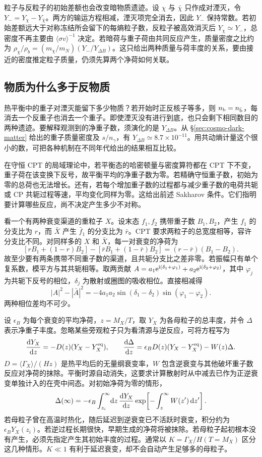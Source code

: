 粒子与反粒子的初始差额也会改变暗物质遗迹。设 $\chi$ 与 $\bar\chi$ 只作成对湮灭，令 $Y_-=Y_\chi-Y_{\bar\chi}$。两方的输运方程相减，湮灭项完全消去，因此 $Y_-$ 保持常数。若初始差额远大于对称冻结所会留下的每熵粒子数，反粒子被高效消灭后 $Y_\chi\simeq Y_-$，总密度不再主要由 $\langle\sigma v\rangle^{-1}$ 决定。若暗荷与重子荷由共同反应产生，质量密度之比约为 $\rho_\chi/\rho_b=(m_\chi/m_N)(Y_-/Y_{\Delta B})$。这只给出两种质量与荷丰度的关系，要由接近的密度推定粒子质量，仍须先算两个净荷如何关联。

\subsection{物质为什么多于反物质}

热平衡中的重子对湮灭能留下多少物质？若开始时正反核子等多，则 $n_{\rm b}=n_{\bar{\rm b}}$，每消去一个反重子也消去一个重子。即使湮灭没有进行到底，也只会剩下相同数目的两种遗迹。要解释观测到的净重子数，须演化的是 $Y_{\Delta B}$。从 \S\ref{sec:cosmo-dark-matter} 给出的重子质量密度及 $s/n_\gamma$，有 $Y_{\Delta B}\simeq8.7\times10^{-11}$。用共动熵计量这个很小的数，可把各种机制在不同年代给出的结果相互比较。

在守恒 CPT 的局域理论中，若平衡态的哈密顿量与密度算符都在 CPT 下不变，重子荷在该变换下反号，故平衡平均的净重子数为零。若精确守恒重子数，初始为零的总荷也无法增长。还有，若每个增加重子数的过程都与减少重子数的电荷共轭或 CP 共轭过程等速，平均变化同样为零。这给出前述 Sakharov 条件。它们指明要计算哪些反应，尚不决定产生多少不对称。

看一个有两种衰变渠道的重粒子 $X$。设末态 $f_1,f_2$ 携带重子数 $B_1,B_2$，产生 $f_1$ 的分支比为 $r$，而 $\bar X$ 产生 $\bar f_1$ 的分支比为 $\bar r$。CPT 要求两粒子的总宽度相等，容许分支比不同。对同样多的 $X$ 和 $\bar X$，每一对衰变的净荷为
\[
 [rB_1+(1-r)B_2]-[\bar rB_1+(1-\bar r)B_2]
 =(r-\bar r)(B_1-B_2).
\]
故至少要有两条携带不同重子数的渠道，且共轭分支比之差非零。若振幅只有单个复系数，模平方与其共轭相等。取两贡献 $A=a_1\mathrm{e}^{\mathrm i(\delta_1+\varphi_1)}+a_2\mathrm{e}^{\mathrm i(\delta_2+\varphi_2)}$，其中 $\varphi_j$ 为共轭下反号的相位，$\delta_j$ 为散射或圈图的吸收相位。直接相减得
\[
 |A|^2-|\bar A|^2=-4a_1a_2
 \sin(\delta_1-\delta_2)\sin(\varphi_1-\varphi_2).
\]
两种相位差均不可少。

设 $\epsilon_B$ 为每个衰变的平均净荷，$z=M_X/T$，取 $Y_X$ 为各母粒子的总丰度，并令 $\Delta$ 表示净重子丰度。忽略某些旁观粒子只为看清源与逆反应，可将方程写为
\[
 \frac{\dd Y_X}{\dd z}=-D(z)(Y_X-Y_X^{\rm eq}),\qquad
 \frac{\dd \Delta}{\dd z}=\epsilon_B D(z)(Y_X-Y_X^{\rm eq})-W(z)\Delta .
\]
$D=\langle\Gamma_X\rangle/(Hz)$ 是热平均后的无量纲衰变率，$W$ 包含逆衰变与其他破坏重子数反应对净荷的抹除。平衡时源自动消失，这要求计算散射时从中减去已作为正逆衰变单独计入的在壳中间态。对初始净荷为零的情形，
\[
 \Delta(\infty)=-\epsilon_B\int_{z_i}^{\infty}\!\dd z\,
 \frac{\dd Y_X}{\dd z}\exp\!\left[-\int_z^\infty W(z')\,\dd z'\right].
\]
若母粒子曾在高温时热化，随后延迟到逆衰变已不活跃时衰变，积分约为 $\epsilon_B Y_X(z_i)$。若逆过程长期很快，早期生成的净荷将被抹除。若母粒子起初根本没有产生，必须先指定产生其初始丰度的过程。通常以 $K=\Gamma_X/H(T=M_X)$ 区分这几种情形。$K\ll1$ 有利于延迟衰变，却不会自动产生足够多的母粒子。

